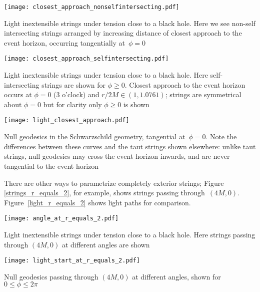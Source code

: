 \documentclass{ws-tpe}
\begin{document}
\begin{figurehere} %
  \centerline{
    \texttt{[image: closest\_approach\_nonselfintersecting.pdf]}
  }
  \caption{Light inextensible strings under tension close to a black
    hole.  Here we see non-self intersecting strings arranged by
    increasing distance of closest approach to the event horizon,
    occurring tangentially at~$\phi=0$}
  \label{closest_approach_non_self_intersecting}
\end{figurehere}

\begin{figurehere} %
  \centerline{
    \texttt{[image: closest\_approach\_selfintersecting.pdf]}
  }
  \caption{Light inextensible strings under tension close to a black
    hole.  Here self-intersecting strings are shown for $\phi\geqslant
    0$.  Closest approach to the event horizon occurs at $\phi=0$ (3
    o'clock) and $r/2M\in\left(1,1.0761\right)$; strings are symmetrical
    about $\phi=0$ but for clarity only $\phi\geqslant 0$ is shown}
  \label{closest_approach_self_intersecting}
\end{figurehere}

\begin{figurehere} %
  \centerline{
    \texttt{[image: light\_closest\_approach.pdf]}
  }
  \caption{Null geodesics in the Schwarzschild geometry, tangential
    at~$\phi=0$.  Note the differences between these curves and the taut
    strings shown elsewhere: unlike taut strings, null geodesics may
    cross the event horizon inwards, and are never tangential to the
    event horizon}
  \label{light_closest_approach}
\end{figurehere}

There are other ways to parametrize completely exterior strings;
Figure \ref{strings_r_equals_2}, for example, shows strings passing
through~$(4M,0)$.  Figure~\ref{light_r_equals_2} shows light paths for
comparison.

\begin{figurehere}
  \centerline{
    \texttt{[image: angle\_at\_r\_equals\_2.pdf]} %
  }
  \caption{Light inextensible strings under tension close to a black
    hole.  Here strings passing through $(4M,0)$ at different angles are
    shown}
  \label{strings_r_equals_2}
\end{figurehere}

\begin{figurehere}
  \centerline{
    \texttt{[image: light\_start\_at\_r\_equals\_2.pdf]} %
  }
  \caption{Null geodesics passing through $(4M,0)$ at different angles,
    shown for $0\leqslant\phi\leqslant 2\pi$}
  \label{light_r_equals_2}
\end{figurehere}
\end{document}
